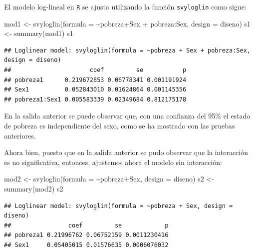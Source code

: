 \documentclass[
  12pt,
]{book}
\newenvironment{Shaded}{\begin{snugshade}}{\end{snugshade}}
\newcommand{\AttributeTok}[1]{\textcolor[rgb]{0.77,0.63,0.00}{#1}}
\newcommand{\FunctionTok}[1]{\textcolor[rgb]{0.00,0.00,0.00}{#1}}
\newcommand{\NormalTok}[1]{#1}
\newcommand{\OtherTok}[1]{\textcolor[rgb]{0.56,0.35,0.01}{#1}}
\newcommand{\SpecialCharTok}[1]{\textcolor[rgb]{0.00,0.00,0.00}{#1}}
\begin{document}
El modelo log-lineal en \texttt{R} se ajusta utilizando la función \texttt{svyloglin} como sigue:

\begin{Shaded}
\begin{Highlighting}[]
\NormalTok{mod1 }\OtherTok{\textless{}{-}} \FunctionTok{svyloglin}\NormalTok{(}\AttributeTok{formula =} \SpecialCharTok{\textasciitilde{}}\NormalTok{pobreza}\SpecialCharTok{+}\NormalTok{Sex }\SpecialCharTok{+}\NormalTok{ pobreza}\SpecialCharTok{:}\NormalTok{Sex, }
                    \AttributeTok{design =}\NormalTok{ diseno)}
\NormalTok{s1 }\OtherTok{\textless{}{-}} \FunctionTok{summary}\NormalTok{(mod1)}
\NormalTok{s1}
\end{Highlighting}
\end{Shaded}

\begin{verbatim}
## Loglinear model: svyloglin(formula = ~pobreza + Sex + pobreza:Sex, design = diseno)
##                      coef         se           p
## pobreza1      0.219672853 0.06778341 0.001191924
## Sex1          0.052843010 0.01624864 0.001145356
## pobreza1:Sex1 0.005583339 0.02349684 0.812175178
\end{verbatim}

En la salida anterior se puede observar que, con una confianza del 95\% el estado de pobreza es independiente del sexo, como se ha mostrado con las pruebas anteriores.

Ahora bien, puesto que en la salida anterior se pudo observar que la interacción es no significativa, entonces, ajustemos ahora el modelo sin interacción:

\begin{Shaded}
\begin{Highlighting}[]
\NormalTok{mod2 }\OtherTok{\textless{}{-}} \FunctionTok{svyloglin}\NormalTok{(}\AttributeTok{formula =} \SpecialCharTok{\textasciitilde{}}\NormalTok{pobreza}\SpecialCharTok{+}\NormalTok{Sex, }
                  \AttributeTok{design =}\NormalTok{ diseno)}
\NormalTok{s2 }\OtherTok{\textless{}{-}} \FunctionTok{summary}\NormalTok{(mod2)}
\NormalTok{s2}
\end{Highlighting}
\end{Shaded}

\begin{verbatim}
## Loglinear model: svyloglin(formula = ~pobreza + Sex, design = diseno)
##                coef         se            p
## pobreza1 0.21996762 0.06752159 0.0011230416
## Sex1     0.05405015 0.01576635 0.0006076032
\end{verbatim}
\end{document}
